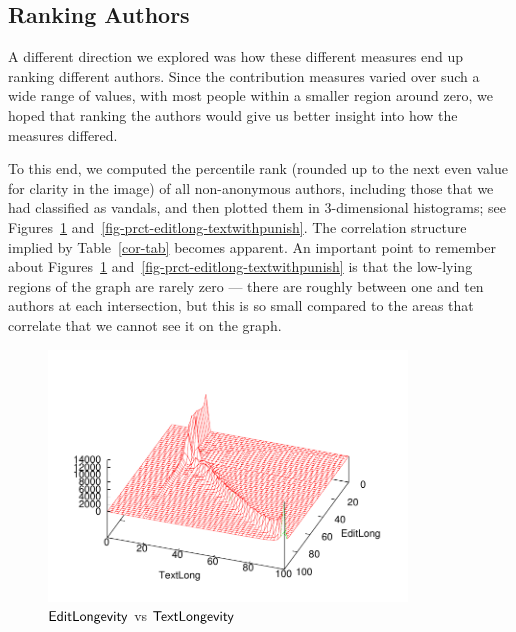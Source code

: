 \subsection{Ranking Authors}

A different direction we explored was how these different
measures end up ranking different authors.
Since the contribution measures varied over such a
wide range of values, with most people within
a smaller region around zero, we hoped that
ranking the authors would give us better insight into how
the measures differed.

To this end,  we computed the percentile rank
(rounded up to the next even value for clarity in the image)
of all non-anonymous authors, including those
that we had classified as vandals, and then plotted
them in 3-dimensional histograms; see
Figures~\ref{fig-prct-editlong-textlong}
and~\ref{fig-prct-editlong-textwithpunish}.
The correlation
structure implied by Table~\ref{cor-tab} becomes apparent.
An important point to remember about
Figures~\ref{fig-prct-editlong-textlong}
and~\ref{fig-prct-editlong-textwithpunish}
is that the low-lying regions of the graph are
rarely zero --- there are roughly between one and ten
authors at each intersection, but this is so small compared
to the areas that correlate that we cannot see it on the graph.
%
\begin{figure}[t]
    \begin{center}
    \includegraphics[width=0.85\textwidth]{part-I10-contrib/graphs/prct-editlong-textlong}
    \end{center}
    \caption[$\editlong$ vs $\textlong$]{
    	$\editlong$ vs $\textlong$
    }
    \label{fig-prct-editlong-textlong}
\end{figure}
%
